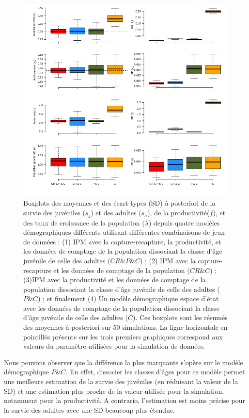 \documentclass[12pt,a4paper]{article}
\begin{document}
\begin{figure}[!t]
\includegraphics[width=17cm]{50sim_CountsJAD_28062022.png}
\caption{Boxplots des moyennes et des écart-types (SD) à posteriori de la survie des juvéniles ($s_j$) et des adultes ($s_a$), de la productivité($f$), et des taux de croissance de la population ($\lambda$) depuis quatre modèles démographiques différents utilisant différentes combinaisons de jeux de données : (1) IPM avec la capture-recapture, la productivité, et les données de comptage de la population dissociant la classe d'âge juvénile de celle des adultes ($CR \& P \& C$) ; (2) IPM avec la capture-recapture et les données de comptage de la population ($CR \& C$) ; (3)IPM avec la productivité et les données de comptage de la population dissociant la classe d'âge juvénile de celle des adultes ($P \& C$) ; et finalement (4) Un modèle démographique espace d'état avec les données de comptage de la population dissociant la classe d'âge juvénile de celle des adultes ($C$). Ces boxplots sont les résumés des moyennes à posteriori sur 50 simulations. La ligne horizontale en pointillés présente sur les trois premiers graphiques correspond aux valeurs du paramètre utilisées pour la simulation de données.}
\end{figure}

Nous pouvons observer que la différence la plus marquante s'opère sur le modèle démographique $P \& C$. En effet, dissocier les classes d'âges pour ce modèle permet une meilleure estimation de la survie des juvéniles (en réduisant la valeur de la SD) et une estimation plus proche de la valeur utilisée pour la simulation, notamment pour la productivité. A contrario, l'estimation est moins précise pour la survie des adultes avec une SD beaucoup plus étendue.
\end{document}
